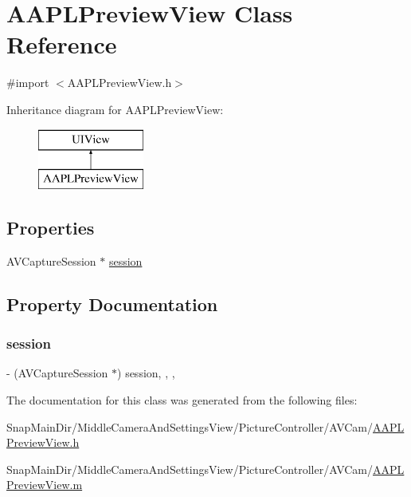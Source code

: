 \hypertarget{interface_a_a_p_l_preview_view}{}\section{A\+A\+P\+L\+Preview\+View Class Reference}
\label{interface_a_a_p_l_preview_view}


{\ttfamily \#import $<$A\+A\+P\+L\+Preview\+View.\+h$>$}

Inheritance diagram for A\+A\+P\+L\+Preview\+View\+:\begin{figure}[H]
\begin{center}
\leavevmode
\includegraphics[height=2.000000cm]{interface_a_a_p_l_preview_view}
\end{center}
\end{figure}
\subsection*{Properties}
\begin{DoxyCompactItemize}
\item 
A\+V\+Capture\+Session $\ast$ \hyperlink{interface_a_a_p_l_preview_view_a1abf41d17b68e2854f0f16b47ba0c363}{session}
\end{DoxyCompactItemize}


\subsection{Property Documentation}
\hypertarget{interface_a_a_p_l_preview_view_a1abf41d17b68e2854f0f16b47ba0c363}{}\label{interface_a_a_p_l_preview_view_a1abf41d17b68e2854f0f16b47ba0c363} 
\subsubsection{\texorpdfstring{session}{session}}
{\footnotesize\ttfamily -\/ (A\+V\+Capture\+Session $\ast$) session\hspace{0.3cm}{\ttfamily [read]}, {\ttfamily [write]}, {\ttfamily [nonatomic]}, {\ttfamily [assign]}}



The documentation for this class was generated from the following files\+:\begin{DoxyCompactItemize}
\item 
Snap\+Main\+Dir/\+Middle\+Camera\+And\+Settings\+View/\+Picture\+Controller/\+A\+V\+Cam/\hyperlink{_a_a_p_l_preview_view_8h}{A\+A\+P\+L\+Preview\+View.\+h}\item 
Snap\+Main\+Dir/\+Middle\+Camera\+And\+Settings\+View/\+Picture\+Controller/\+A\+V\+Cam/\hyperlink{_a_a_p_l_preview_view_8m}{A\+A\+P\+L\+Preview\+View.\+m}\end{DoxyCompactItemize}

